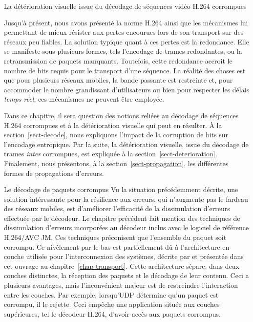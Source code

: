 \documentclass[letterpaper, twoside, 12pt,memoire]{thETS}
\newcommand{\ltCodec}{logiciel de référence H.264/AVC JM}
\newcommand{\sect}[1]{section~\ref{#1}}
\begin{document}
\begin{chapter}{La détérioration visuelle issue du décodage de séquences vidéo
H.264 corrompues}

Jusqu'à présent, nous avons présenté la norme H.264 ainsi que les mécanismes lui
permettant de mieux résister aux pertes encourues lors de son transport sur des
réseaux peu fiables. La solution typique quant à ces pertes est la redondance.
Elle se manifeste sous plusieurs formes, tels l'encodage de trames redondantes,
ou la retransmission de paquets manquants. Toutefois, cette redondance accroit
le nombre de bits requis pour le transport d'une séquence. La réalité des choses
est que pour plusieurs réseaux mobiles, la bande passante est restreinte et,
pour accommoder le nombre grandissant d'utilisateurs ou bien pour respecter les
délais \textit{temps réel}, ces mécanismes ne peuvent être employée.

Dans ce chapitre, il sera question des notions reliées au décodage de séquences
H.264 corrompues et à la détérioration visuelle qui peut en résulter. À la
\sect{sect-decode}, nous expliquons l'impact de la corruption de bits sur
l'encodage entropique. Par la suite, la détérioration visuelle, issue du
décodage de trames \textit{inter} corrompues, est expliquée à la
\sect{sect-deterioration}. Finalement, nous présentons, à la
\sect{sect-propagation}, les différentes formes de propagations d'erreurs.

\begin{section}{Le décodage de paquets corrompus}
\label{sect-decode}
Vu la situation précédemment décrite, une solution intéressante pour la
résilience aux erreurs, qui n'augmente pas le fardeau des réseaux mobiles, est
d'améliorer l'efficacité de la dissimulation d'erreurs effectuée par le
décodeur. Le chapitre précédent fait mention des techniques de dissimulation
d'erreurs incorporées au décodeur inclus avec le \ltCodec. Ces techniques
préconisent que l'ensemble du paquet soit corrompu. Ce nivèlement par le bas est
partiellement dû à l'architecture en couche utilisée pour l'interconnexion des
systèmes, décrite par \citet{Zimmermann1980} et présentée dans cet ouvrage au
chapitre~\ref{chap-transport}. Cette architecture sépare, dans deux couches
distinctes, la réception des paquets et le décodage de leur contenu. Ceci a
plusieurs avantages, mais l'inconvénient majeur est de restreindre l'interaction
entre les couches. Par exemple, lorsqu'UDP détermine qu'un paquet est corrompu,
il le rejette. Ceci empêche une application située aux couches supérieures, tel
le décodeur H.264, d'avoir accès aux paquets corrompus.


\end{section}
\end{chapter}
\end{document}
